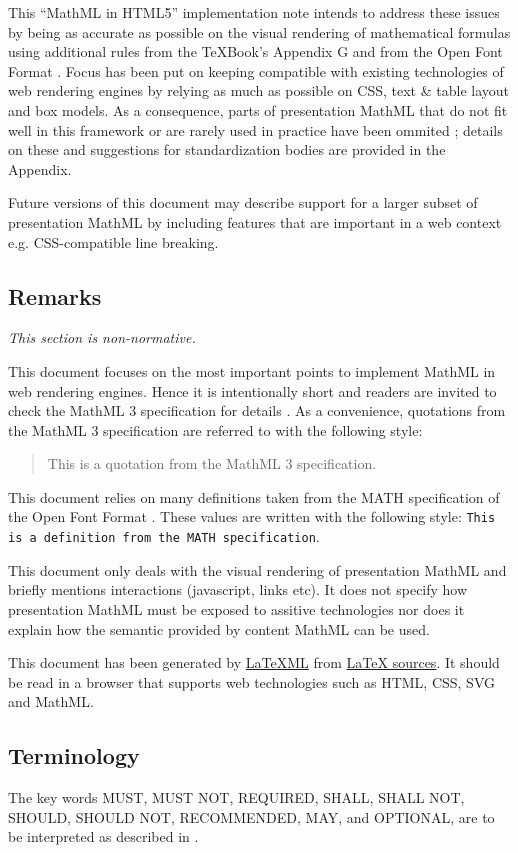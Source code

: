 This ``MathML in HTML5'' implementation note intends to address these issues by
being as accurate as
possible on the visual rendering of mathematical formulas using additional
rules from the \TeX Book's Appendix G \cite{TeXBook} and from
the Open Font Format \cite{OpenFontFormat3}.
Focus has been put on keeping compatible with existing technologies of web
rendering engines \cite{HTML5} by relying as much as possible on CSS, text \&
table layout and box models. As a consequence, parts of presentation MathML
that do not fit well in this framework or are rarely used in practice
have been ommited ; details on these and suggestions for standardization bodies
are provided in the Appendix.

Future versions of this document may describe support for a larger subset
of presentation MathML by including features that are important in a web context
e.g. CSS-compatible line breaking.

\subsection{Remarks}

{\em This section is non-normative.}

This document focuses on the most important points to implement
MathML in web rendering engines. Hence it is intentionally short and readers are
invited to check the MathML 3 specification for details \cite{MathML3}.
As a convenience, quotations from the MathML 3 specification are referred to
with the following style:
\begin{quote}
  This is a quotation from the MathML 3 specification.
\end{quote}

This document relies on many definitions taken from the MATH specification
of the Open Font Format \cite{OpenFontFormat3}. These values are written with
the following style:
{\tt This is a definition from the MATH specification}.

This document only deals with the visual rendering of presentation MathML
and briefly mentions interactions (javascript, links etc). It does not specify
how presentation MathML must be exposed to assitive technologies nor does it
explain how the semantic provided by content MathML can be used.

This document has been generated by
\href{http://dlmf.nist.gov/LaTeXML/}{LaTeXML} from
\href{https://github.com/MathML/MathMLinHTML5}{LaTeX sources}. It
should be read in a browser that supports web technologies
such as HTML, CSS, SVG and MathML.

\subsection{Terminology}

The key words MUST, MUST NOT, REQUIRED, SHALL, SHALL NOT, SHOULD, SHOULD NOT,
RECOMMENDED, MAY, and OPTIONAL, are to be interpreted as described in
\cite{IETF RFC 2119}.
